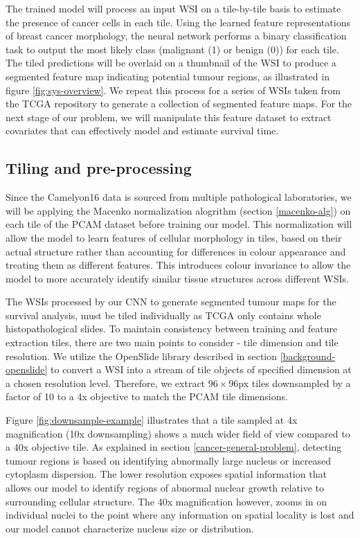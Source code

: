 \documentclass{l4proj}
\begin{document}
 The trained model will process an input WSI on a tile-by-tile basis to estimate the presence of cancer cells in each tile. Using the learned feature representations of breast cancer morphology, the neural network performs a binary classification task to output the most likely class (malignant (1) or benign (0)) for each tile. The tiled predictions will be overlaid on a thumbnail of the WSI to produce a segmented feature map indicating potential tumour regions, as illustrated in figure \ref{fig:sys-overview}. We repeat this process for a series of WSIs taken from the TCGA repository to generate a collection of segmented feature maps. For the next stage of our problem, we will manipulate this feature dataset to extract covariates that can effectively model and estimate survival time. 

\subsection{Tiling and pre-processing} \label{tiling-design}
Since the Camelyon16 data is sourced from multiple pathological laboratories, we will be applying the Macenko normalization alogrithm (section \ref{macenko-alg}) on each tile of the PCAM dataset before training our model. This normalization will allow the model to learn features of cellular morphology in tiles, based on their actual structure rather than accounting for differences in colour appearance and treating them as different features. This introduces colour invariance to allow the model to more accurately identify similar tissue structures across different WSIs. 

The WSIs processed by our CNN to generate segmented tumour maps for the survival analysis, must be tiled individually as TCGA only contains whole histopathological slides. To maintain consistency between training and feature extraction tiles, there are two main points to consider - tile dimension and tile resolution. We utilize the OpenSlide library described in section \ref{background-openslide} to convert a WSI into a stream of tile objects of specified dimension at a chosen resolution level. Therefore, we extract \(96 \times 96\)px tiles downsampled by a factor of 10 to a 4x objective to match the PCAM tile dimensions.

Figure \ref{fig:downsample-example} illustrates that a tile sampled at 4x magnification (10x downsampling) shows a much wider field of view compared to a 40x objective tile. As explained in section \ref{cancer-general-problem}, detecting tumour regions is based on identifying abnormally large nucleus or increased cytoplasm dispersion. The lower resolution exposes spatial information that allows our model to identify regions of abnormal nuclear growth relative to surrounding cellular structure. The 40x magnification however, zooms in on individual nuclei to the point where any information on spatial locality is lost and our model cannot characterize nucleus size or distribution. 
\end{document}
